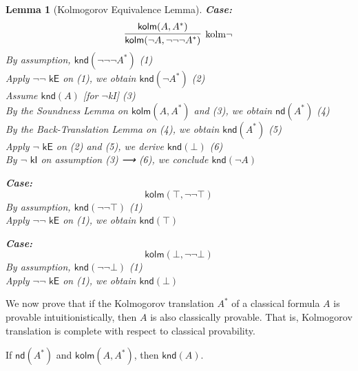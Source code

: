 \documentclass{article}
\newtheorem{lemma}{Lemma}
\begin{document}
\begin{lemma}[Kolmogorov Equivalence Lemma]
    \noindent \textbf{Case:} 
    \[
    \infer[\text{kolm$\neg$}]{\textsf{kolm}(\neg A, \neg\neg\neg A^*)}{
      \textsf{kolm}(A, A^*)
    }
    \]
    By assumption, $\textsf{knd}(\neg\neg\neg A^*)$ \hfill (1)\\
    Apply $\textsf{$\neg\neg$ kE}$ on (1), we obtain $\textsf{knd}(\neg A^*)$ \hfill (2)\\
    Assume $\textsf{knd}(A)$ [for $\neg$kI] \hfill (3)\\
    By the Soundness Lemma on $\textsf{kolm}(A, A^*)$ and (3), we obtain $\textsf{nd}(A^*)$ \hfill (4)\\
    By the Back-Translation Lemma on (4), we obtain $\textsf{knd}(A^*)$ \hfill (5)\\
    Apply $\textsf{$\neg$ kE}$ on (2) and (5), we derive $\textsf{knd}(\bot)$ \hfill (6)\\
    By $\textsf{$\neg$ kI}$ on assumption (3) ⟶ (6), we conclude $\textsf{knd}(\neg A)$
    
    \medskip
    
    \noindent \textbf{Case:} 
    \[
    \textsf{kolm}(\top, \neg\neg \top)
    \]
    By assumption, $\textsf{knd}(\neg\neg \top)$ \hfill (1)\\
    Apply $\textsf{$\neg\neg$ kE}$ on (1), we obtain $\textsf{knd}(\top)$
    
    \medskip
    
    \noindent \textbf{Case:} 
    \[
    \textsf{kolm}(\bot, \neg\neg \bot)
    \]
    By assumption, $\textsf{knd}(\neg\neg \bot)$ \hfill (1)\\
    Apply $\textsf{$\neg\neg$ kE}$ on (1), we obtain $\textsf{knd}(\bot)$
    \end{lemma}

    \bigskip

    We now prove that if the Kolmogorov translation $A^*$ of a classical formula $A$ is provable intuitionistically, then $A$ is also classically provable. That is, Kolmogorov translation is complete with respect to classical provability.


    \label{lem:completeness}
    If $\textsf{nd}(A^*)$ and $\textsf{kolm}(A, A^*)$, then $\textsf{knd}(A)$.
    
\end{document}
